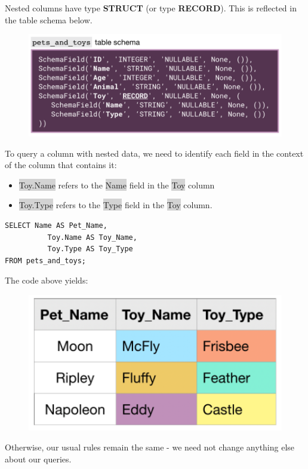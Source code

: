 \documentclass[11pt]{article}
\begin{document}
{{{{{{{{Nested columns have type \textbf{STRUCT} (or type \textbf{RECORD}). This is reflected in the table schema below.
\begin{figure}[H]
\includegraphics[scale = 0.8]{6_2}
\centering
\end{figure}
\vspace{-4mm}
To query a column with nested data, we need to identify each field in the context of the column that contains it:
\begin{itemize}[leftmargin = *]
\item \colorbox{lightgray}{Toy.Name} refers to the \colorbox{lightgray}{Name} field in the \colorbox{lightgray}{Toy} column
\item \colorbox{lightgray}{Toy.Type} refers to the \colorbox{lightgray}{Type} field in the \colorbox{lightgray}{Toy} column.
\end{itemize}
\begin{lstlisting}
SELECT Name AS Pet_Name, 
	      Toy.Name AS Toy_Name, 
	      Toy.Type AS Toy_Type
FROM pets_and_toys;
\end{lstlisting}
The code above yields: 
\begin{figure}[H]
\includegraphics[scale = 0.7]{6_3}
\centering
\end{figure}
\vspace{-4mm}
Otherwise, our usual rules remain the same - we need not change anything else about our queries.

}}}}}}}}
\end{document}
